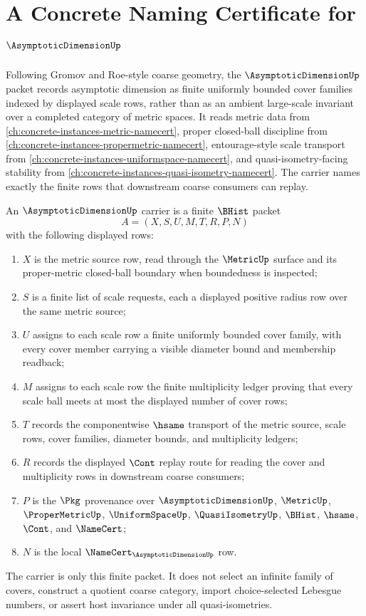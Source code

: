 \chapter{A Concrete Naming Certificate for $\AsymptoticDimensionUp$}
\label{ch:concrete-instances-asymptotic-dimension-namecert}

Following Gromov and Roe-style coarse geometry, the $\AsymptoticDimensionUp$ packet records asymptotic dimension as finite uniformly bounded cover families indexed by displayed scale rows, rather than as an ambient large-scale invariant over a completed category of metric spaces. It reads metric data from \autoref{ch:concrete-instances-metric-namecert}, proper closed-ball discipline from \autoref{ch:concrete-instances-propermetric-namecert}, entourage-style scale transport from \autoref{ch:concrete-instances-uniformspace-namecert}, and quasi-isometry-facing stability from \autoref{ch:concrete-instances-quasi-isometry-namecert}. The carrier names exactly the finite rows that downstream coarse consumers can replay.

\begin{definition}
\label{def:asymptotic-dimension-carrier}
An $\AsymptoticDimensionUp$ carrier is a finite $\BHist$ packet
$$
A=(X,S,U,M,T,R,P,N)
$$
with the following displayed rows:
\begin{enumerate}
\item $X$ is the metric source row, read through the $\MetricUp$ surface and its proper-metric closed-ball boundary when boundedness is inspected;
\item $S$ is a finite list of scale requests, each a displayed positive radius row over the same metric source;
\item $U$ assigns to each scale row a finite uniformly bounded cover family, with every cover member carrying a visible diameter bound and membership readback;
\item $M$ assigns to each scale row the finite multiplicity ledger proving that every scale ball meets at most the displayed number of cover rows;
\item $T$ records the componentwise $\hsame$ transport of the metric source, scale rows, cover families, diameter bounds, and multiplicity ledgers;
\item $R$ records the displayed $\Cont$ replay route for reading the cover and multiplicity rows in downstream coarse consumers;
\item $P$ is the $\Pkg$ provenance over $\AsymptoticDimensionUp$, $\MetricUp$, $\ProperMetricUp$, $\UniformSpaceUp$, $\QuasiIsometryUp$, $\BHist$, $\hsame$, $\Cont$, and $\NameCert$;
\item $N$ is the local $\NameCert_{\AsymptoticDimensionUp}$ row.
\end{enumerate}
The carrier is only this finite packet. It does not select an infinite family of covers, construct a quotient coarse category, import choice-selected Lebesgue numbers, or assert host invariance under all quasi-isometries.
\end{definition}

